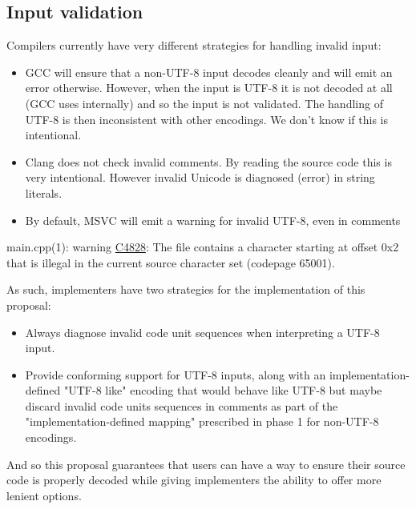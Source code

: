 \documentclass{wg21}
\begin{document}
\subsection{Input validation}

Compilers currently have very different strategies for handling invalid input:

\begin{itemize}
\item GCC will ensure that a non-UTF-8 input decodes cleanly and will emit an error otherwise. However, when the input is UTF-8 it is
not decoded at all (GCC uses internally) and so the input is not validated. The handling of UTF-8 is then inconsistent with other encodings.
We don't know if this is intentional.
\item Clang does not check invalid comments. By reading the source code this is very intentional. However invalid Unicode is diagnosed (error) in string literals.
\item By default, MSVC will emit a warning for invalid UTF-8, even in comments
\end{itemize}

\begin{quoteblock}
main.cpp(1): warning \href{https://docs.microsoft.com/en-us/cpp/error-messages/compiler-warnings/compiler-warnings-by-compiler-version?view=msvc-160#warnings-introduced-in-visual-studio-2015-update-2-compiler-version-1900239180}{C4828}: The file contains a character starting at offset 0x2 that is illegal in the current source character set (codepage 65001).
\end{quoteblock}

As such, implementers have two strategies for the implementation of this proposal:

\begin{itemize}
\item Always diagnose invalid code unit sequences when interpreting a UTF-8 input.
\item Provide conforming support for UTF-8 inputs, along with an implementation-defined "UTF-8 like" encoding that would behave like UTF-8 but maybe discard
invalid code units sequences in comments as part of the "implementation-defined mapping" prescribed in phase 1 for non-UTF-8 encodings.
\end{itemize}

And so this proposal guarantees that users can have a way to ensure their source code is properly decoded while giving implementers
the ability to offer more lenient options.
\end{document}
